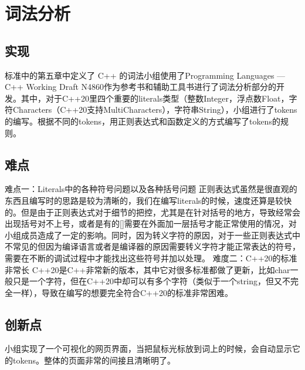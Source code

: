 \section{词法分析}

\subsection{实现}

标准中的第五章中定义了 C++ 的词法小组使用了Programming Languages — C++ Working Draft N4860作为参考书和辅助工具书进行了词法分析部分的开发。其中，对于C++20里四个重要的literals类型（整数Integer，浮点数Float，字符Characters（C++20支持MultiCharacters），字符串String），小组进行了tokens的编写。根据不同的tokens，用正则表达式和函数定义的方式编写了tokens的规则。

\subsection{难点}

难点一：Literals中的各种符号问题以及各种括号问题
正则表达式虽然是很直观的东西且编写时的思路是较为清晰的，我们在编写literals的时候，速度还算是较快的。但是由于正则表达式对于细节的把控，尤其是在针对括号的地方，导致经常会出现括号对不上号，或者是有的[]需要在外面加一层括号才能正常使用的情况，对小组成员造成了一定的影响。同时，因为转义字符的原因，对于一些正则表达式中不常见的但因为编译语言或者是编译器的原因需要转义字符才能正常表达的符号，需要在不断的调试过程中才能找出这些符号并加以处理。
	难度二：C++20的标准非常长
C++20是C++非常新的版本，其中它对很多标准都做了更新，比如char一般只是一个字符，但在C++20中却可以有多个字符（类似于一个string，但又不完全一样），导致在编写的想要完全符合C++20的标准非常困难。

\subsection{创新点}

小组实现了一个可视化的网页界面，当把鼠标光标放到词上的时候，会自动显示它的tokens。整体的页面非常的间接且清晰明了。